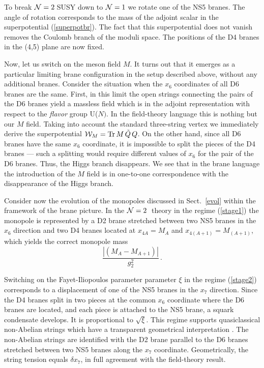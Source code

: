 \documentclass[epsfig,12pt]{article}
\newcommand{\ntwo}{${\cal N}=2\;$}
\newcommand{\none}{${\cal N}=1\;$}
\begin{document}
To break \ntwo SUSY down to \none we rotate one of the NS5 branes.
The angle of rotation corresponds to the mass of the adjoint scalar 
in the superpotential (\ref{superpotbr}).
The fact that this superpotential does not vanish
removes the Coulomb branch of the moduli space.
The positions of the D4 branes in the (4,5) plane are now fixed.

Now, let us switch on the meson field $M$.
It turns out that it emerges as a particular limiting
brane configuration in the setup described above,
without any additional branes. Consider the situation
when the $x_6$ coordinates of all D6 branes are the same.   
First, in this limit the open strings connecting the pairs of the D6 branes
yield a massless field which is in the adjoint representation with
respect to the {\em flavor} group U($N)$.
In the field-theory language this is
nothing but  our $M$ field. Taking into account the standard three-string vertex
we immediately derive the superpotential
${\cal W}_M= {\rm Tr}\, M\,\tilde{Q}\, Q$. On the other hand, since all
D6 branes have the same $x_6$ coordinate, it is impossible
to  split the pieces of the D4 branes --- such a  splitting would require
different values of $x_6$ for the pair of the D6 branes. Thus,
the Higgs branch disappears. We see that
in the brane language the introduction of the $M$ field
is in one-to-one correspondence with the disappearance of the Higgs branch.

Consider now the evolution of the monopoles discussed in
Sect.~\ref{evol}  within the framework of the brane picture. In the \ntwo
theory in the regime (\ref{stage1}) 
the monopole is represented by a D2 brane stretched
between two NS5 branes in the $x_6$ direction and two D4 branes located at
$x_{4A}=M_{A}$ and $x_{4(A+1)}=M_{(A+1)}$,
which yields the correct monopole mass
$$
\frac{\left|(M_A -M_{A+1})\right|}{g_2^2}\,.
$$

Switching on the Fayet-Iliopoulos parameter parameter $\xi$  in the regime 
(\ref{stage2}) corresponds to a displacement of one of the NS5 branes
in the $x_7$ direction. Since the D4 branes split in two pieces at the common
$x_6$ coordinate where the D6 branes are located, 
and each piece is attached to the  NS5
brane, a squark condensate develops. It is proportional to $\sqrt{\xi}$.
This regime supports quasiclassical non-Abelian strings which
have a transparent geometrical interpretation \cite{HT1}.
The non-Abelian strings are identified with the D2 brane
parallel to the D6 branes stretched between
two NS5 branes along the $x_7$ coordinate. Geometrically, 
the string  tension   equals  $\delta x_7$,
in full agreement with the field-theory result.
\end{document}
